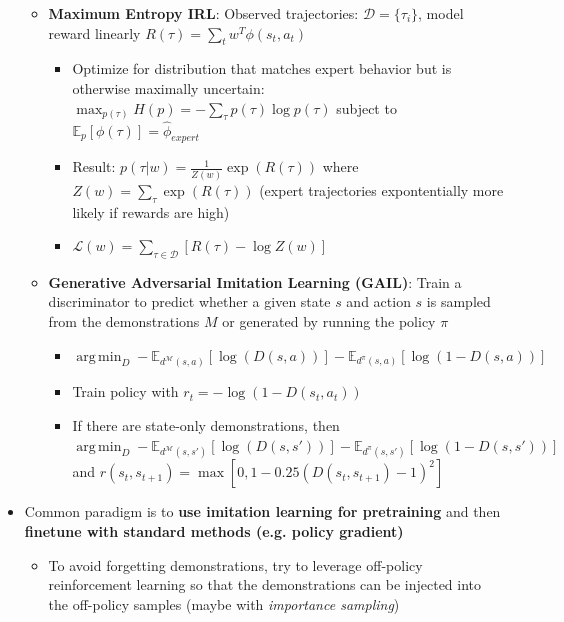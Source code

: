 \documentclass{article}
\providecommand{\tightlist}{%
  \setlength{\itemsep}{\GlobalItemSep}\setlength{\parskip}{\GlobalListParSkip}}
\newlength{\GlobalItemSep}
\newlength{\GlobalListParSkip}
\DeclareMathOperator*{\argmin}{arg\,min}
\begin{document}
\begin{multicols}{2}
\begin{itemize}
  \begin{itemize}
  \tightlist
  \item
    \textbf{Maximum Entropy IRL}: Observed trajectories:
    \(\mathcal{D} = \{\tau_i\}\), model reward linearly
    \(R(\tau) = \sum_t w^T \phi(s_t, a_t)\)

    \begin{itemize}
    \tightlist
    \item
      Optimize for distribution that matches expert behavior but is
      otherwise maximally uncertain:
      \(\max_{p(\tau)} H(p) = - \sum_\tau p(\tau) \log p(\tau)\) subject
      to \(\mathbb{E}_p [\phi(\tau)] = \hat{\phi}_{expert}\)
    \item
      Result: \(p(\tau | w) = \frac{1}{Z(w)}\exp(R(\tau))\) where
      \(Z(w) = \sum_\tau \exp(R(\tau))\) (expert trajectories
      expontentially more likely if rewards are high)
    \item
      \(\mathcal{L} (w) = \sum_{\tau \in \mathcal{D}}[R(\tau) - \log Z(w)]\)
    \end{itemize}
  \item
    \textbf{Generative Adversarial Imitation Learning (GAIL)}: Train a
    discriminator to predict whether a given state \(s\) and action
    \(s\) is sampled from the demonstrations \(M\) or generated by
    running the policy \(\pi\)

    \begin{itemize}
    \tightlist
    \item
      \(\argmin_D - \mathbb{E}_{d^{\mathcal{M}}(s, a)}[\log (D(s,a))] - \mathbb{E}_{d^\pi (s,a)}[\log (1 - D(s,a))]\)
    \item
      Train policy with \(r_t = -\log (1 - D(s_t, a_t))\)
    \item
      If there are state-only demonstrations, then
      \(\argmin_D - \mathbb{E}_{d^{\mathcal{M}}(s, s')}[\log (D(s, s'))] - \mathbb{E}_{d^\pi (s, s')}[\log (1 - D(s, s'))]\)
      and
      \(r(s_t, s_{t+1}) = \max [0, 1 - 0.25 (D(s_t, s_{t+1}) - 1)^2]\)
    \end{itemize}
  \end{itemize}
\item
  Common paradigm is to \textbf{use imitation learning for pretraining}
  and then \textbf{finetune with standard methods (e.g. policy
  gradient)}

  \begin{itemize}
  \tightlist
  \item
    To avoid forgetting demonstrations, try to leverage off-policy
    reinforcement learning so that the demonstrations can be injected
    into the off-policy samples (maybe with \emph{importance sampling})
  \end{itemize}
\end{itemize}


\end{multicols}
\end{document}
